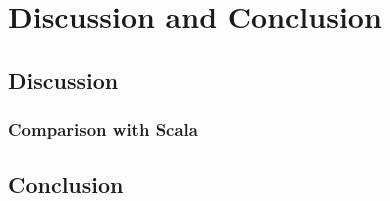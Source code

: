 
\part{Discussion and Conclusion}
\chapter{Discussion}
\section{Comparison with Scala}

\chapter{Conclusion}

